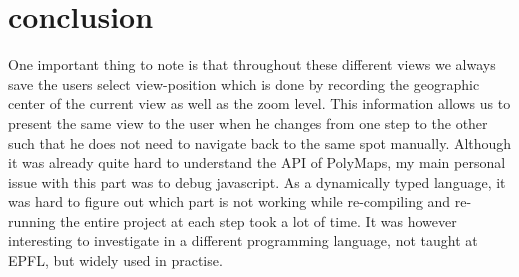 \section{conclusion}
One important thing to note is that throughout these different views we always save the users select view-position which is done by recording the geographic center of the current view as well as the zoom level. This information allows us to present the same view to the user when he changes from one step to the other such that he does not need to navigate back to the same spot manually.
Although it was already quite hard to understand the API of PolyMaps, my main personal issue with this part was to debug javascript. As a dynamically typed language, it was hard to figure out which part is not working while re-compiling and re-running the entire project at each step took a lot of time. It was however interesting to investigate in a different programming language, not taught at EPFL, but widely used in practise.
